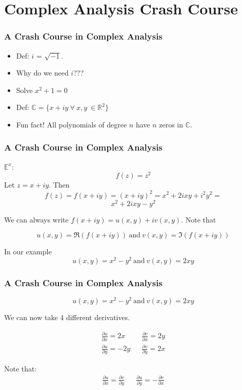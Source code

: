 \documentclass{beamer}
\def\R{\mathbb{R}}                     %
\def\C{\mathbb{C}}                     %
\begin{document}
\section{Complex Analysis Crash Course}

\begin{frame}
\frametitle{A Crash Course in Complex Analysis}

\begin{itemize}[<+->]
  \item Def: $i$ = $\sqrt{-1}$.
  \item Why do we need $i$???
  \item Solve $x^2 + 1 = 0$
  \item Def: $\C = \{x + iy \ \forall \ x,y \ \in \R^2 \}$
  \item Fun fact! All polynomials of degree $n$ have $n$ zeros in $\C$.
\end{itemize}


\end{frame}

\begin{frame}
\frametitle{A Crash Course in Complex Analysis}

$\mathbb{E}^x$:
\[ f(z) = z^2 \]
\pause
Let $z=x+iy$. Then
\[ f(z) = f(x+iy) = (x+iy)^2 = x^2 +2ixy + i^2y^2 = \]
\[ x^2+ 2ixy - y^2 \]

\pause
We can always write $f(x+iy) = u(x,y) + iv(x,y)$. Note that

\[ u(x,y) = \mathfrak{R}(f(x+iy)) \ \mathrm{and} \ v(x,y) = \mathfrak{I}(f(x+iy)) \]

\pause
In our example
\[ u(x,y) = x^2 - y^2 \ \mathrm{and} \ v(x,y) = 2xy \]

\end{frame}

\begin{frame}
\frametitle{A Crash Course in Complex Analysis}

\[ u(x,y) = x^2 - y^2 \ \mathrm{and} \ v(x,y) = 2xy \]

We can now take 4 different derivatives.

\begin{eqnarray*}
\frac{\partial u}{\partial x} = 2x && \frac{\partial v}{\partial x} = 2y \\
\frac{\partial u}{\partial y} = -2y && \frac{\partial v}{\partial y} = 2x
\end{eqnarray*}

\pause
  Note that:
  \begin{eqnarray*}
  \frac{\partial u}{\partial x} = \frac{\partial v}{\partial y} &&
  \frac{\partial u}{\partial y} = -\frac{\partial v}{\partial x}
  \end{eqnarray*}

\end{frame}
\end{document}
